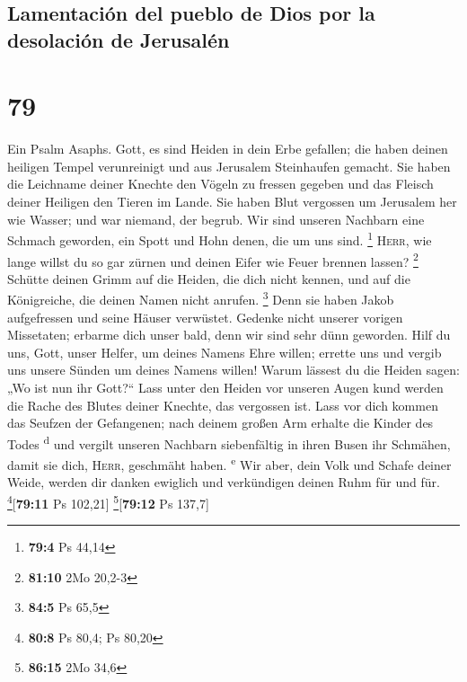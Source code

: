 \hypertarget{lamentaciuxf3n-del-pueblo-de-dios-por-la-desolaciuxf3n-de-jerusaluxe9n}{%
\subsection{Lamentación del pueblo de Dios por la desolación de
Jerusalén}\label{lamentaciuxf3n-del-pueblo-de-dios-por-la-desolaciuxf3n-de-jerusaluxe9n}}

\hypertarget{section-78}{%
\section{79}\label{section-78}}

 Ein Psalm Asaphs. Gott, es sind Heiden in dein Erbe
gefallen; die haben deinen heiligen Tempel verunreinigt und aus
Jerusalem Steinhaufen gemacht.  Sie haben die Leichname
deiner Knechte den Vögeln zu fressen gegeben und das Fleisch deiner
Heiligen den Tieren im Lande.  Sie haben Blut vergossen um
Jerusalem her wie Wasser; und war niemand, der begrub. 
Wir sind unseren Nachbarn eine Schmach geworden, ein Spott und Hohn
denen, die um uns sind. \footnote{\textbf{79:4} Ps 44,14} 
\textsc{Herr}, wie lange willst du so gar zürnen und deinen Eifer wie
Feuer brennen lassen? \footnote{\textbf{81:10} 2Mo 20,2-3}
 Schütte deinen Grimm auf die Heiden, die dich nicht
kennen, und auf die Königreiche, die deinen Namen nicht anrufen.
\footnote{\textbf{84:5} Ps 65,5}  Denn sie haben Jakob
aufgefressen und seine Häuser verwüstet.  Gedenke nicht
unserer vorigen Missetaten; erbarme dich unser bald, denn wir sind sehr
dünn geworden.  Hilf du uns, Gott, unser Helfer, um deines
Namens Ehre willen; errette uns und vergib uns unsere Sünden um deines
Namens willen!  Warum lässest du die Heiden sagen: „Wo
ist nun ihr Gott?{}`` Lass unter den Heiden vor unseren Augen kund
werden die Rache des Blutes deiner Knechte, das vergossen ist.
 Lass vor dich kommen das Seufzen der Gefangenen; nach
deinem großen Arm erhalte die Kinder des Todes \textsuperscript{d}
 und vergilt unseren Nachbarn siebenfältig in ihren Busen
ihr Schmähen, damit sie dich, \textsc{Herr}, geschmäht haben.
\textsuperscript{e}  Wir aber, dein Volk und Schafe
deiner Weide, werden dir danken ewiglich und verkündigen deinen Ruhm für
und für. \footnote{\textbf{80:8} Ps 80,4; Ps 80,20}{[}\textbf{79:11} Ps
102,21{]} \footnote{\textbf{86:15} 2Mo 34,6}{[}\textbf{79:12} Ps
137,7{]}

